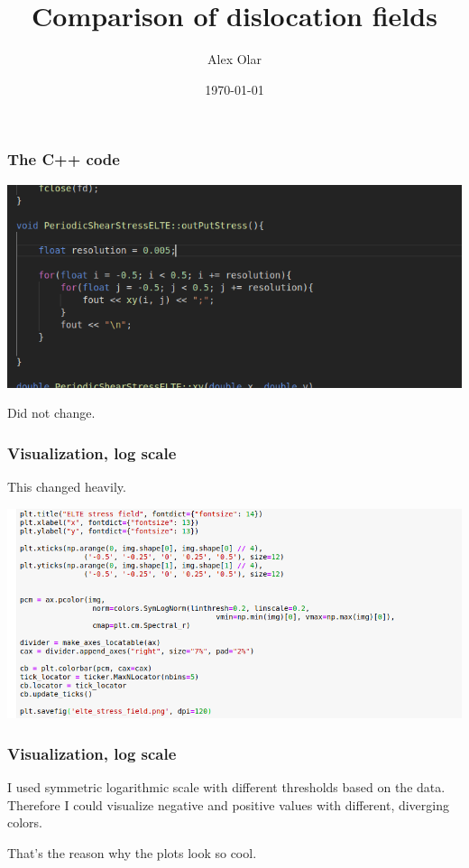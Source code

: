 \documentclass{beamer}
\title{Comparison of dislocation fields} %
\author{Alex Olar} %
\institute[ELTE] %
{
University of Eotvos Lorand \\ %
\medskip
\textit{olaralex@caesar.elte.hu} %
}
\date{\today} %
\begin{document}
\begin{frame}
    \titlepage %
\end{frame}

\begin{frame}
    \frametitle{The C++ code}

    \begin{center}
        \includegraphics[width=.9\textwidth]{code.png}
    \end{center}

    \par Did not change.

\end{frame}


\begin{frame}
    \frametitle{Visualization, log scale}

    \par This changed heavily.

    \begin{center}
        \includegraphics[width=.9\textwidth]{visu.png}
    \end{center}

\end{frame}

\begin{frame}
    \frametitle{Visualization, log scale}
    \par I used symmetric logarithmic scale with different thresholds
    based on the data. Therefore I could visualize negative and positive values
    with different, diverging colors.

    \vspace{1cm}

    \par That's the reason why the plots look so cool.
\end{frame}
\end{document}
